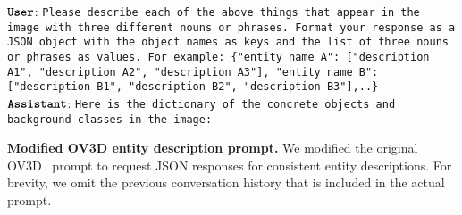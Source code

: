 \begin{table}[h]
    \centering
    \begin{minipage}{0.99\columnwidth}
        \vspace{0mm}
        \centering
        \begin{tcolorbox} 
            \raggedright
            \small
            $\texttt{\textbf{User}}$: \texttt{Please describe each of the above things that appear in the image with three different nouns or phrases.
            Format your response as a JSON object with the object names as keys and the list of three nouns or phrases as values.
            For example: \{"entity name A": ["description A1", "description A2", "description A3"], "entity name B": ["description B1", "description B2", "description B3"],..\}} \\
            $\texttt{\textbf{Assistant}}$: \texttt{Here is the dictionary of the concrete objects and background classes in the image:}
        \end{tcolorbox}
    \end{minipage}
    \caption{
        \textbf{Modified OV3D entity description prompt.}
        We modified the original OV3D~\cite{jiang2024open} prompt to request JSON responses for consistent entity descriptions.
        For brevity, we omit the previous conversation history that is included in the actual prompt.
    }
    \label{tab:ov3d_prompt}
    \vspace{-4mm}
\end{table}
